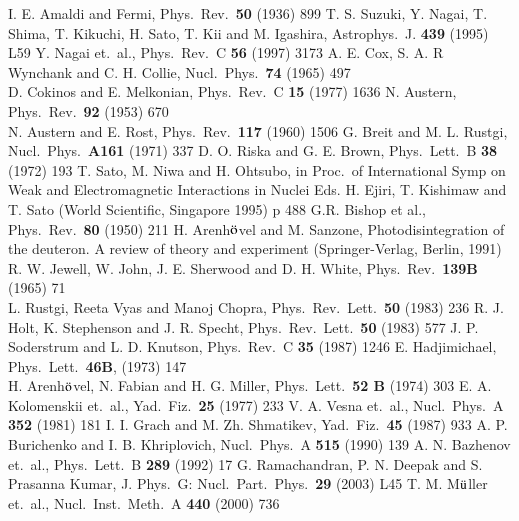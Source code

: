 \begin{thebibliography}{99}
I. E. Amaldi and Fermi, Phys.\ Rev.\ {\bf 50} (1936) 899
 T. S. Suzuki, Y. Nagai, T. Shima, T. Kikuchi, H. Sato, T. Kii and M. Igashira, Astrophys.\ J. {\bf 439} (1995) L59
 Y. Nagai et.\ al., Phys.\ Rev.\ C {\bf 56} (1997) 3173
 A. E. Cox, S. A. R Wynchank and C. H. Collie, Nucl.\ Phys.\ {\bf 74} (1965) 497\\
D. Cokinos and E. Melkonian, Phys.\ Rev.\ C {\bf 15} (1977) 1636
 N. Austern, Phys.\ Rev.\ {\bf 92} (1953) 670\\
N. Austern and E. Rost, Phys.\ Rev.\ {\bf 117} (1960) 1506
 G. Breit and M. L. Rustgi, Nucl.\ Phys.\ {\bf A161} (1971) 337
 D. O. Riska and G. E. Brown, Phys.\ Lett.\ B {\bf 38} (1972) 193
 T. Sato, M. Niwa and H. Ohtsubo, in Proc.\ of International Symp on Weak and Electromagnetic Interactions in Nuclei Eds. H. Ejiri, T. Kishimaw and T. Sato (World Scientific, Singapore 1995) p 488
 G.R. Bishop et al., Phys.\ Rev.\ {\bf 80} (1950) 211
 H. Arenh$\ddot{\rm o}$vel and M. Sanzone, Photodisintegration of the deuteron. A review of theory and experiment (Springer-Verlag, Berlin, 1991)
 R. W. Jewell, W. John, J. E. Sherwood and D. H. White, Phys.\ Rev.\ {\bf 139B} (1965) 71\\
L. Rustgi, Reeta Vyas and Manoj Chopra, Phys.\ Rev.\ Lett.\ {\bf 50} (1983) 236
 R. J. Holt, K. Stephenson and J. R. Specht, Phys.\ Rev.\ Lett.\ {\bf 50} (1983) 577
 J. P. Soderstrum and L. D. Knutson, Phys.\ Rev.\ C {\bf 35} (1987) 1246
 E. Hadjimichael, Phys.\ Lett.\ {\bf 46B}, (1973) 147\\
H. Arenh$\ddot{\rm o}$vel, N. Fabian and H. G. Miller, Phys.\ Lett.\ {\bf 52 B} (1974) 303
 E. A. Kolomenskii  et.\ al., Yad.\ Fiz.\ {\bf 25} (1977) 233
 V. A. Vesna  et.\ al., Nucl.\ Phys.\ A {\bf 352} (1981) 181
 I. I. Grach and M. Zh. Shmatikev, Yad.\ Fiz.\ {\bf 45} (1987) 933
 A. P. Burichenko and I. B. Khriplovich, Nucl.\ Phys.\ A {\bf 515} (1990) 139
 A. N. Bazhenov et.\ al., Phys.\ Lett.\ B {\bf 289} (1992) 17
 G. Ramachandran, P. N. Deepak and S. Prasanna Kumar, J. Phys.\ G: Nucl.\ Part.\ Phys.\ {\bf 29} (2003) L45
 T. M. M$\ddot{\rm u}$ller et.\ al., Nucl.\ Inst.\ Meth.\ A {\bf 440} (2000) 736

\end{thebibliography}
